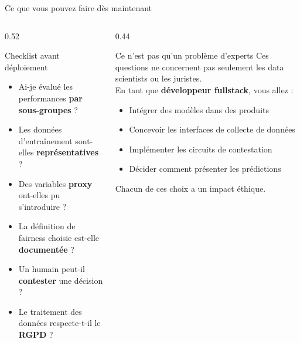 \documentclass[aspectratio=169, 10pt]{beamer}
\begin{document}
\begin{frame}{Ce que vous pouvez faire dès maintenant}
  \begin{columns}[T]
    \begin{column}{0.52\textwidth}
      \begin{exampleblock}{Checklist avant déploiement}
        \begin{itemize}
          \item[$\square$] Ai-je évalué les performances
                \textbf{par sous-groupes} ?
          \item[$\square$] Les données d'entraînement
                sont-elles \textbf{représentatives} ?
          \item[$\square$] Des variables \textbf{proxy}
                ont-elles pu s'introduire ?
          \item[$\square$] La définition de fairness
                choisie est-elle \textbf{documentée} ?
          \item[$\square$] Un humain peut-il
                \textbf{contester} une décision ?
          \item[$\square$] Le traitement des données
                respecte-t-il le \textbf{RGPD} ?
        \end{itemize}
      \end{exampleblock}
    \end{column}
    \begin{column}{0.44\textwidth}
      \begin{block}{Ce n'est pas qu'un problème d'experts}
        Ces questions ne concernent pas seulement
        les data scientists ou les juristes.\\[4pt]
        En tant que \textbf{développeur fullstack},
        vous allez :
        \begin{itemize}
          \item Intégrer des modèles dans des produits
          \item Concevoir les interfaces de collecte
                de données
          \item Implémenter les circuits de contestation
          \item Décider comment présenter les prédictions
        \end{itemize}
        Chacun de ces choix a un impact éthique.
      \end{block}
    \end{column}
  \end{columns}
\end{frame}
\end{document}

